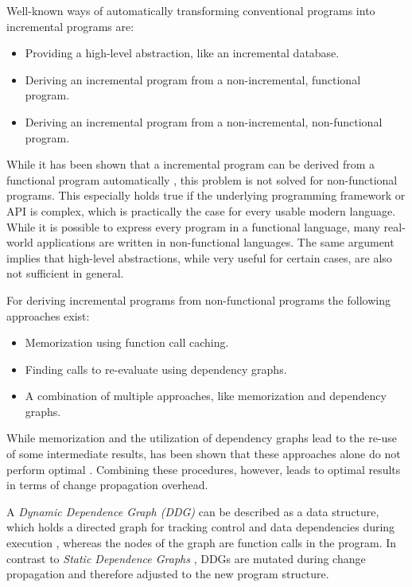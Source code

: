 Well-known ways of automatically transforming conventional programs into incremental programs are: 
\begin{itemize}
\item Providing a high-level abstraction, like an incremental database. \cite{Peng2010}
\item Deriving an incremental program from a non-incremental, functional program. \cite{liu1995systematic}  \cite{ley2008compiling} 
\item Deriving an incremental program from a non-incremental, non-functional program. \cite{heydon2000caching} \cite{Pugh1989} \cite{cohen1991dynamic} \cite{naiadIncremental} \cite{Hammer2009} \cite{Chen2014} \cite{Acar2008} \cite{acar2006adaptive} 
\end{itemize}

While it has been shown that a incremental program can be derived from a functional program automatically \cite{ley2008compiling}, this problem is not solved for non-functional programs. This especially holds true if the underlying programming framework or API is complex, which is practically the case for every usable modern language. While it is possible to express every program in a functional language, many real-world applications are written in non-functional languages. 
The same argument implies that high-level abstractions, while very useful for certain cases, are also not sufficient in general. 

For deriving incremental programs from non-functional programs the following approaches exist: 
\begin{itemize}
\item Memorization using function call caching. \cite{heydon2000caching} \cite{Pugh1989} 
\item Finding calls to re-evaluate using dependency graphs. \cite{cohen1991dynamic}
\item A combination of multiple approaches, like memorization and dependency graphs. \cite{Hammer2009} \cite{Chen2014} \cite{Acar2008} \cite{acar2006adaptive} \cite{naiadIncremental}
\end{itemize}

While memorization and the utilization of dependency graphs lead to the re-use of some intermediate results, has been shown that these approaches alone do not perform optimal \cite{Acar2005thesis}. Combining these procedures, however, leads to optimal results in terms of change propagation overhead. 

A \textit{Dynamic Dependence Graph (DDG)} can be described as a data structure, which holds a directed graph for tracking control and data dependencies during execution \cite{Acar2005thesis}, whereas the nodes of the graph are function calls in the program. In contrast to \textit{Static Dependence Graphs} \cite{Demers1981}, DDGs are mutated during change propagation and therefore adjusted to the new program structure. 

